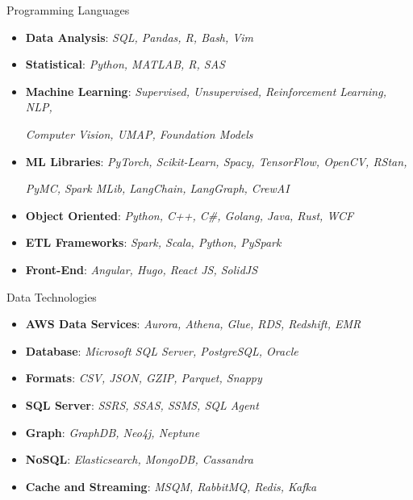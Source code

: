 
\Technology
{Programming Languages}
{\faCode}
{\begin{itemize}
    \item \textbf{Data Analysis}:
      \emph{SQL, Pandas, R, Bash, Vim}
    \item \textbf{Statistical}:
      \emph{Python, MATLAB, R, SAS}
    \item \textbf{Machine Learning}:
      \emph{Supervised, Unsupervised, Reinforcement Learning, NLP,}
        \newline \strut\hspace*{0.25 in}
        \emph{Computer Vision, UMAP, Foundation Models}
    \item \textbf{ML Libraries}:
      \emph{PyTorch, Scikit-Learn, Spacy, TensorFlow, OpenCV, RStan,}
        \newline \strut\hspace*{0.25 in}
        \emph{PyMC, Spark MLib, LangChain, LangGraph, CrewAI}
    \item \textbf{Object Oriented}:
      \emph{Python, C++, C\#, Golang, Java, Rust, WCF}
    \item \textbf{ETL Frameworks}:
      \emph{Spark, Scala, Python, PySpark}
    \item \textbf{Front-End}:
      \emph{Angular, Hugo, React JS, SolidJS}
\end{itemize}}

\vspace*{0.01 in}

\Technology
{Data Technologies}
{\faDatabase}
{\begin{itemize}
    \item \textbf{AWS Data Services}:
      \emph{Aurora, Athena, Glue, RDS, Redshift, EMR}
    \item \textbf{Database}:
      \emph{Microsoft SQL Server, PostgreSQL, Oracle}
    \item \textbf{Formats}:
      \emph{CSV, JSON, GZIP, Parquet, Snappy}
    \item \textbf{SQL Server}:
      \emph{SSRS, SSAS, SSMS, SQL Agent}
    \item \textbf{Graph}:
      \emph{GraphDB, Neo4j, Neptune}
    \item \textbf{NoSQL}:
      \emph{Elasticsearch, MongoDB, Cassandra}
    \item \textbf{Cache and Streaming}:
      \emph{MSQM, RabbitMQ, Redis, Kafka}
\end{itemize}}

